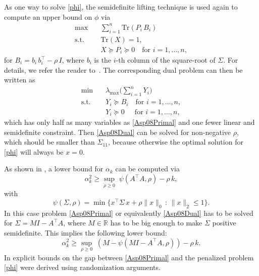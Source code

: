 \documentclass[journal]{IEEEtran}
\newcommand{\suchthat}{\,:\,}
\newcommand{\Norm}[2]{\lVert{#1}\rVert_{#2}}
\newcommand{\T}{^{\top}}
\newcommand{\Tr}{\text{Tr}}
\newcommand{\R}{\mathds{R}}
\begin{document}
As one way to solve \eqref{phi}, the semidefinite lifting technique is used again to compute an upper bound on $\phi$ via
\begin{equation}\label{Asp08Primal}\tag{A2-Primal}
 \begin{aligned}
  \max \quad & \sum_{i=1}^n \Tr(P_i \, B_i) \\
  \text{s.t.} \quad & \Tr(X) = 1, \\
  & X \succeq P_i \succeq 0 \quad \text{for } i = 1, \dots, n,
 \end{aligned}
\end{equation}
for $B_i = b_i\,b_i\T - \rho\, I$, where $b_i$ is the $i$-th column of the
square-root of $\Sigma$. For details, we refer the reader to~\cite{Asp08}. The corresponding dual problem can then be written as 
\begin{equation}\label{Asp08Dual}\tag{A2-Dual}
 \begin{aligned}
  \min \quad & \lambda_{\max}\Big(\sum_{i=1}^n Y_i \Big) \\
  \text{s.t.} \quad & Y_i \succeq B_i \quad \text{for } i = 1, \dots, n, \\
  & Y_i \succeq 0 \quad \ \ \text{for } i = 1, \dots, n,
 \end{aligned}
\end{equation}
which has only half as many variables as \eqref{Asp08Primal} and one fewer linear and semidefinite constraint. Then \eqref{Asp08Dual} can be solved for non-negative $\rho$, which should be smaller than $\Sigma_{11}$, because otherwise the
optimal solution for \eqref{phi} will always be $x=0$. 

As shown in \cite{Asp08}, a lower bound for $\alpha_k$ can be computed via
\begin{equation}\tag{A2}\label{Asp08}
 \alpha_k^2 \geq \sup_{\rho \geq 0}\; \psi(A\T A, \rho) - \rho\, k, 
\end{equation}
with 
\begin{equation*}
  \psi(\Sigma, \rho) = \min \big\{ x\T \Sigma\, x + \rho \Norm{x}{0} \suchthat \Norm{x}{2} \leq 1\big\}.
\end{equation*}
In this case problem \eqref{Asp08Primal} or equivalently \eqref{Asp08Dual} has to
be solved for $\Sigma = M I - A\T A$, where $M \in \R$ has to be big enough
to make $\Sigma$ positive semidefinite. This implies the following lower bound:
\begin{equation*}
  \alpha_k^2 \geq \sup_{\rho \geq 0}\; (M - \psi(M I - A\T A, \rho)) - \rho\, k.
\end{equation*}
In \cite{AspBG14} explicit bounds on the gap between \eqref{Asp08Primal} and the penalized problem \eqref{phi} were derived using randomization arguments.
 
\end{document}
